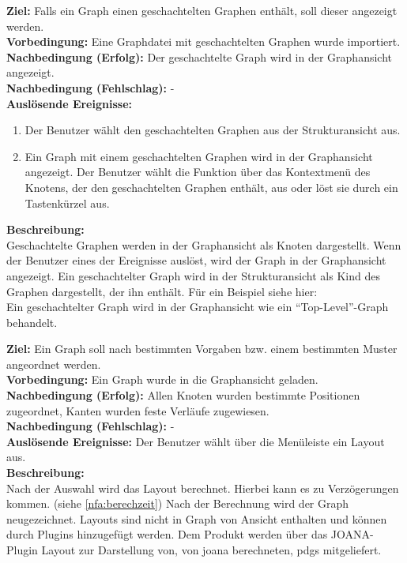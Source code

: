 \label{fa:hierarchgraph}
\textbf{Ziel:} Falls ein Graph einen geschachtelten Graphen enthält, soll dieser angezeigt werden.\\
\textbf{Vorbedingung:} Eine Graphdatei mit geschachtelten Graphen wurde importiert.\\
\textbf{Nachbedingung (Erfolg):} Der geschachtelte Graph wird in der Graphansicht angezeigt.\\
\textbf{Nachbedingung (Fehlschlag):} -\\
\textbf{Auslösende Ereignisse:}
\begin{enumerate}[nolistsep, label=(\alph*)]
  \item Der Benutzer wählt den geschachtelten Graphen aus der Strukturansicht aus.
  \item Ein Graph mit einem geschachtelten Graphen wird in der Graphansicht angezeigt.
  Der Benutzer wählt die Funktion über das Kontextmenü des Knotens, der den geschachtelten Graphen enthält, aus oder löst sie durch ein Tastenkürzel aus.
\end{enumerate}
\textbf{Beschreibung:}\\
Geschachtelte Graphen werden in der Graphansicht als Knoten dargestellt.
Wenn der Benutzer eines der Ereignisse auslöst, wird der Graph in der Graphansicht angezeigt.
Ein geschachtelter Graph wird in der Strukturansicht als Kind des Graphen dargestellt, der ihn enthält. Für ein Beispiel siehe hier:\\ %
Ein geschachtelter Graph wird in der Graphansicht wie ein ``Top-Level''-Graph behandelt. %


\label{fa:layout}
\textbf{Ziel:} Ein Graph soll nach bestimmten Vorgaben bzw. einem bestimmten Muster angeordnet werden.\\
\textbf{Vorbedingung:} Ein Graph wurde in die Graphansicht geladen.\\
\textbf{Nachbedingung (Erfolg):} Allen Knoten wurden bestimmte Positionen zugeordnet, Kanten wurden feste Verläufe zugewiesen.\\
\textbf{Nachbedingung (Fehlschlag):} -\\
\textbf{Auslösende Ereignisse:}
Der Benutzer wählt über die Menüleiste ein Layout aus.\\
\textbf{Beschreibung:}\\
Nach der Auswahl wird das Layout berechnet. Hierbei kann es zu Verzögerungen kommen. (siehe \ref{nfa:berechzeit})
Nach der Berechnung wird der Graph neugezeichnet. Layouts sind nicht in Graph von Ansicht enthalten und können durch Plugins hinzugefügt werden.
Dem Produkt werden über das JOANA-Plugin Layout zur Darstellung von, von \gls{joana} berechneten, \gls{pdg}s mitgeliefert.

